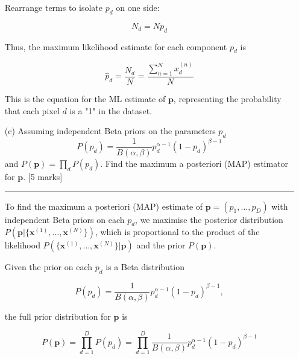 \documentclass{article}
\begin{document}
\begin{enumerate}
    Rearrange terms to isolate \(p_d\) on one side:
    
    \begin{equation}
    N_d = N p_d
    \end{equation}
    
    Thus, the maximum likelihood estimate for each component \(p_d\) is
    
    \begin{equation}
    \boxed{\hat{p}_d = \frac{N_d}{N} = \frac{\sum_{n=1}^N x_d^{(n)}}{N}}
    \end{equation}
    
    This is the equation for the ML estimate of \(\mathbf{p}\), representing the probability that each pixel \(d\) is a "1" in the dataset.
    \vspace{10pt}
    

    \item[(c)] Assuming independent Beta priors on the parameters $p_d$
    \[
    P(p_d) = \frac{1}{B(\alpha, \beta)} p_d^{\alpha - 1}(1 - p_d)^{\beta - 1}
    \]
    and $P(\mathbf{p}) = \prod_d P(p_d)$. Find the maximum a posteriori (MAP) estimator for $\mathbf{p}$. [5 marks]

    \noindent\textcolor{gray}{\rule{0.1\linewidth}{0.4pt}}
    
    \vspace{5pt}

    To find the maximum a posteriori (MAP) estimate of \(\mathbf{p} = (p_1, \ldots, p_D)\) with independent Beta priors on each \(p_d\), we maximise the posterior distribution \(P(\mathbf{p} | \{\mathbf{x}^{(1)}, \ldots, \mathbf{x}^{(N)}\})\), which is proportional to the product of the likelihood \(P(\{\mathbf{x}^{(1)}, \ldots, \mathbf{x}^{(N)}\} | \mathbf{p})\) and the prior \(P(\mathbf{p})\).

    Given the prior on each \(p_d\) is a Beta distribution
    
    \begin{equation}
    P(p_d) = \frac{1}{B(\alpha, \beta)} p_d^{\alpha - 1} (1 - p_d)^{\beta - 1},
    \end{equation}
    
    the full prior distribution for \(\mathbf{p}\) is
    
    \begin{equation}
    P(\mathbf{p}) = \prod_{d=1}^D P(p_d) = \prod_{d=1}^D \frac{1}{B(\alpha, \beta)} p_d^{\alpha - 1} (1 - p_d)^{\beta - 1}
    \end{equation}
    

\end{enumerate}
\end{document}
